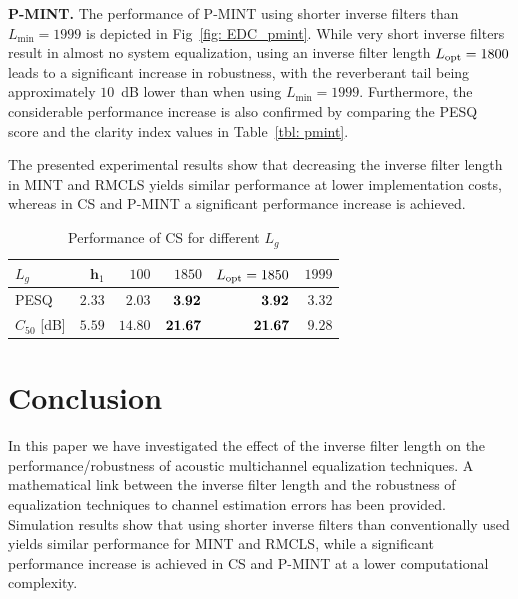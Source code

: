 \documentclass{article}
\begin{document}
\smallskip \noindent \textbf{P-MINT.} \enspace The performance of P-MINT using shorter inverse filters than $L_{\min} = 1999$ is depicted in Fig~\ref{fig: EDC_pmint}. While very short inverse filters result in almost no system equalization, using an inverse filter length $L_{\rm opt} = 1800$ leads to a significant increase in robustness, with the reverberant tail being approximately $10$~dB lower than when using $L_{\min} = 1999$. 
Furthermore, the considerable performance increase is also confirmed by comparing the PESQ score and the clarity index values in Table~\ref{tbl: pmint}.

The presented experimental results show that decreasing the inverse filter length in MINT and RMCLS yields similar performance at lower implementation costs, whereas in CS and P-MINT a significant performance increase is achieved. 

\begin{table}[t!]
\footnotesize
\centering
\caption{Performance of CS for different $L_g$}
\label{tbl: cs}
 \begin{tabular}{|l|r|r|r|r|r|}
   \hline
   $L_g$ & $\mathbf{h}_1$ & $100$ & $1850$ & $L_{\rm opt} = 1850$ & $1999$   \\ \hline
   PESQ & $2.33$ & $2.03$ & $\bf{3.92}$ & $\bf{3.92}$ & $3.32$ \\ \hline
   $C_{50}$ [dB] & $5.59$ & $14.80$ & $\bf{21.67}$ & $\bf{21.67}$ & $9.28$ \\ \hline
\end{tabular}
\vspace{-0.1cm}
\end{table}

\vspace{-0.2cm}
\section{Conclusion}
\vspace{-0.2cm}
In this paper we have investigated the effect of the inverse filter length on the performance/robustness of acoustic multichannel equalization techniques.
A mathematical link between the inverse filter length and the robustness of equalization techniques to channel estimation errors has been provided. 
Simulation results show that using shorter inverse filters than conventionally used yields similar performance for MINT and RMCLS, while a significant performance increase is achieved in CS and P-MINT at a lower computational complexity.
\end{document}
